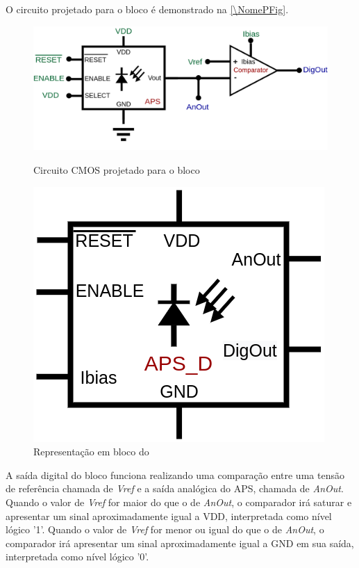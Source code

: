 O circuito projetado para o bloco \'e demonstrado na \autoref{\NomePFig}.

\begin{figure}[!h]
 \centering
    \centering
    \caption{Circuito CMOS projetado para o bloco \NomeBloco} 
    \includegraphics[scale=0.3]{Circuitos/APS_digitalized.png}
    \label{\NomePFig}
\end{figure}

\begin{figure}[!h]
 \centering
    \centering
    \caption{\label{\NomeSFig}Representação em bloco do \NomeBloco}
    \includegraphics[scale=0.3]{Circuitos/APS_digitalized_block.png}
\end{figure}

A sa\'ida digital do bloco funciona realizando uma comparação entre uma tensão de refer\^encia chamada de \textit{Vref} e a sa\'ida anal\'ogica do APS, chamada de \textit{AnOut}. Quando o valor de \textit{Vref} for maior do que o de \textit{AnOut}, o comparador ir\'a saturar e apresentar um sinal aproximadamente igual a VDD, interpretada como n\'ivel l\'ogico '1'. Quando o valor de \textit{Vref} for menor ou igual do que o de \textit{AnOut}, o comparador ir\'a apresentar um sinal aproximadamente igual a GND em sua sa\'ida, interpretada como n\'ivel l\'ogico '0'.

